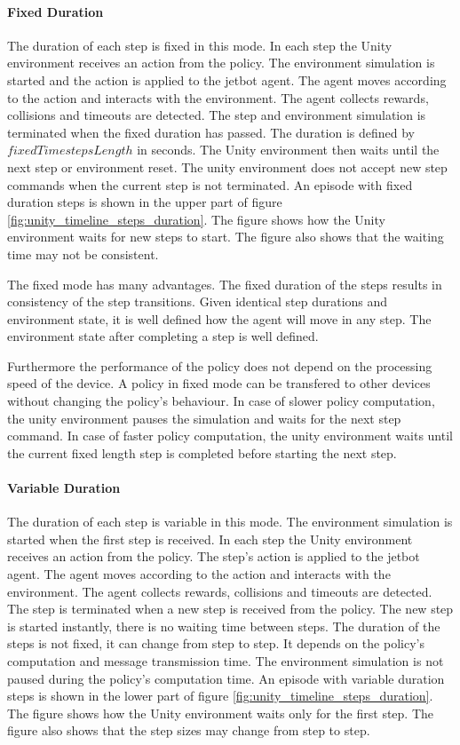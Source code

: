 \paragraph{Fixed Duration}

The duration of each step is fixed in this mode. In each step the Unity environment receives an action from the policy. The environment simulation is started and the action is applied to the jetbot agent. The agent moves according to the action and interacts with the environment. The agent collects rewards, collisions and timeouts are detected. The step and environment simulation is terminated when the fixed duration has passed. The duration is defined by $fixedTimestepsLength$ in seconds. The Unity environment then waits until the next step or environment reset. The unity environment does not accept new step commands when the current step is not terminated.
An episode with fixed duration steps is shown in the upper part of figure \ref{fig:unity_timeline_steps_duration}. The figure shows how the Unity environment waits for new steps to start. The figure also shows that the waiting time may not be consistent.

The fixed mode has many advantages. The fixed duration of the steps results in consistency of the step transitions. Given identical step durations and environment state, it is well defined how the agent will move in any step. The environment state after completing a step is well defined.

Furthermore the performance of the policy does not depend on the processing speed of the device. A policy in fixed mode can be transfered to other devices without changing the policy's behaviour. In case of slower policy computation, the unity environment pauses the simulation and waits for the next step command. In case of faster policy computation, the unity environment waits until the current fixed length step is completed before starting the next step.


\paragraph{Variable Duration}

The duration of each step is variable in this mode. The environment simulation is started when the first step is received. In each step the Unity environment receives an action from the policy. The step's action is applied to the jetbot agent. The agent moves according to the action and interacts with the environment. The agent collects rewards, collisions and timeouts are detected. The step is terminated when a new step is received from the policy. The new step is started instantly, there is no waiting time between steps.
The duration of the steps is not fixed, it can change from step to step. It depends on the policy's computation and message transmission time. The environment simulation is not paused during the policy's computation time.
An episode with variable duration steps is shown in the lower part of figure \ref{fig:unity_timeline_steps_duration}. The figure shows how the Unity environment waits only for the first step. The figure also shows that the step sizes may change from step to step.

